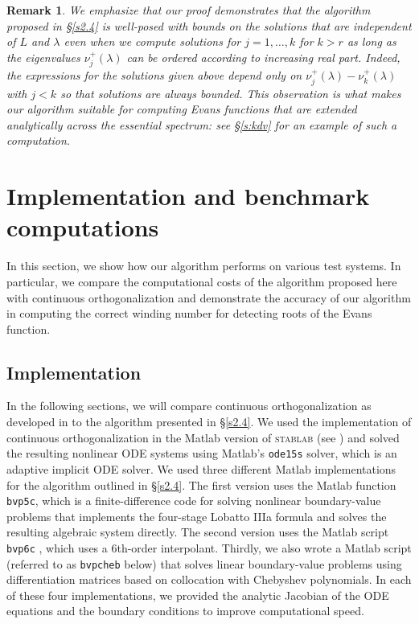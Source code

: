 \documentclass[10pt]{article}
\newtheorem{Remark}{Remark}
\numberwithin{equation}{section}
\begin{document}
\begin{Remark}\label{r:1}
We emphasize that our proof demonstrates that the algorithm proposed in \S\ref{s2.4} is well-posed with bounds on the solutions that are independent of $L$ and $\lambda$ even when we compute solutions for $j=1,\ldots,k$ for $k>r$ as long as the eigenvalues $\nu^+_j(\lambda)$ can be ordered according to increasing real part. Indeed, the expressions for the solutions given above depend only on $\nu^+_j(\lambda)-\nu^+_k(\lambda)$ with $j<k$ so that solutions are always bounded. This observation is what makes our algorithm suitable for computing Evans functions  that are extended analytically across the essential spectrum: see \S\ref{s:kdv} for an example of such a computation.
\end{Remark}


\section{Implementation and benchmark computations}\label{s3}

In this section, we show how our algorithm performs on various test systems. In particular, we compare the computational costs of the algorithm proposed here with continuous orthogonalization and demonstrate the accuracy of our algorithm in computing the correct winding number for detecting roots of the Evans function.


\subsection{Implementation}\label{s3.1}

In the following sections, we will compare continuous orthogonalization as developed in \citep{HuZ2,Z5} to the algorithm presented in \S\ref{s2.4}. We used the implementation of continuous orthogonalization in the Matlab version of \textsc{stablab} (see \citep{STABLAB}) and solved the resulting nonlinear ODE systems using Matlab's \texttt{ode15s} solver, which is an adaptive implicit ODE solver. We used three different Matlab implementations for the algorithm outlined in \S\ref{s2.4}. The first version uses the Matlab function \texttt{bvp5c}, which is a finite-difference code for solving nonlinear boundary-value problems that implements the four-stage Lobatto IIIa formula and solves the resulting algebraic system directly. The second version uses the Matlab script \texttt{bvp6c} \citep{HM}, which uses a 6th-order interpolant. Thirdly, we also wrote a Matlab script (referred to as \texttt{bvpcheb} below) that solves linear boundary-value problems using differentiation matrices based on collocation with Chebyshev polynomials. In each of these four implementations, we provided the analytic Jacobian of the ODE equations and the boundary conditions to improve computational speed.
\end{document}
